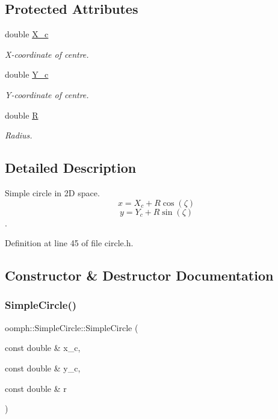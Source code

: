 \subsection*{Protected Attributes}
\begin{DoxyCompactItemize}
\item 
double \hyperlink{classoomph_1_1SimpleCircle_abd34367dbf586e6aa73314b350a370d1}{X\+\_\+c}
\begin{DoxyCompactList}\small\item\em X-\/coordinate of centre. \end{DoxyCompactList}\item 
double \hyperlink{classoomph_1_1SimpleCircle_a3f72f452d54ff683b72a15178dd5daae}{Y\+\_\+c}
\begin{DoxyCompactList}\small\item\em Y-\/coordinate of centre. \end{DoxyCompactList}\item 
double \hyperlink{classoomph_1_1SimpleCircle_afd2a653946537f867c0aaa12768f9514}{R}
\begin{DoxyCompactList}\small\item\em Radius. \end{DoxyCompactList}\end{DoxyCompactItemize}


\subsection{Detailed Description}
Simple circle in 2D space. \[ x = X_c + R \cos(\zeta) \] \[ y = Y_c + R \sin(\zeta) \]. 

Definition at line 45 of file circle.\+h.



\subsection{Constructor \& Destructor Documentation}
\mbox{\label{classoomph_1_1SimpleCircle_a501ee89b2c05eebad1214b9cc4207176}} 
\subsubsection{\texorpdfstring{Simple\+Circle()}{SimpleCircle()}}
{\footnotesize\ttfamily oomph\+::\+Simple\+Circle\+::\+Simple\+Circle (\begin{DoxyParamCaption}\item[{const double \&}]{x\+\_\+c,  }\item[{const double \&}]{y\+\_\+c,  }\item[{const double \&}]{r }\end{DoxyParamCaption})\hspace{0.3cm}{\ttfamily [inline]}}



